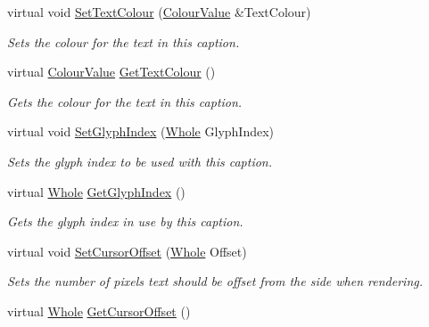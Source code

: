 \begin{DoxyCompactItemize}
virtual void \hyperlink{classphys_1_1UI_1_1Caption_ab6c5ffc2ed3fac9d806c2930ad948b52}{SetTextColour} (\hyperlink{classphys_1_1ColourValue}{ColourValue} \&TextColour)
\begin{DoxyCompactList}\small\item\em Sets the colour for the text in this caption. \item\end{DoxyCompactList}\item 
virtual \hyperlink{classphys_1_1ColourValue}{ColourValue} \hyperlink{classphys_1_1UI_1_1Caption_a32bb578e6e92986839e1cd49edfe9422}{GetTextColour} ()
\begin{DoxyCompactList}\small\item\em Gets the colour for the text in this caption. \item\end{DoxyCompactList}\item 
virtual void \hyperlink{classphys_1_1UI_1_1Caption_ae1730a1af375f858069f63eb05bcb718}{SetGlyphIndex} (\hyperlink{namespacephys_a460f6bc24c8dd347b05e0366ae34f34a}{Whole} GlyphIndex)
\begin{DoxyCompactList}\small\item\em Sets the glyph index to be used with this caption. \item\end{DoxyCompactList}\item 
virtual \hyperlink{namespacephys_a460f6bc24c8dd347b05e0366ae34f34a}{Whole} \hyperlink{classphys_1_1UI_1_1Caption_a4181591a3186ec4d1f87946891a0ef26}{GetGlyphIndex} ()
\begin{DoxyCompactList}\small\item\em Gets the glyph index in use by this caption. \item\end{DoxyCompactList}\item 
virtual void \hyperlink{classphys_1_1UI_1_1Caption_a7020e2ee58857b67888c31b75b76efc5}{SetCursorOffset} (\hyperlink{namespacephys_a460f6bc24c8dd347b05e0366ae34f34a}{Whole} Offset)
\begin{DoxyCompactList}\small\item\em Sets the number of pixels text should be offset from the side when rendering. \item\end{DoxyCompactList}\item 
virtual \hyperlink{namespacephys_a460f6bc24c8dd347b05e0366ae34f34a}{Whole} \hyperlink{classphys_1_1UI_1_1Caption_a381133922b882500ae0bf503acb4c6a4}{GetCursorOffset} ()

\end{DoxyCompactItemize}
